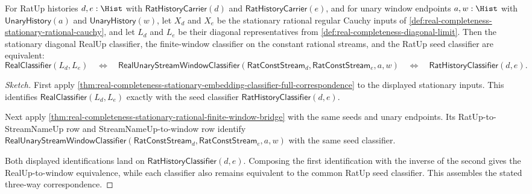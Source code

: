 \begin{theorem}
\label{thm:real-completeness-stationary-diagonal-window-classifier-correspondence}
For RatUp histories $d,e:\Hist$ with $\mathsf{RatHistoryCarrier}(d)$ and
$\mathsf{RatHistoryCarrier}(e)$, and for unary window endpoints $a,w:\Hist$
with $\mathsf{UnaryHistory}(a)$ and $\mathsf{UnaryHistory}(w)$, let $X_d$ and
$X_e$ be the stationary rational regular Cauchy inputs of
\autoref{def:real-completeness-stationary-rational-cauchy}, and let $L_d$ and
$L_e$ be their diagonal representatives from
\autoref{def:real-completeness-diagonal-limit}. Then the stationary diagonal
RealUp classifier, the finite-window classifier on the constant rational
streams, and the RatUp seed classifier are equivalent:
$$
\mathsf{RealClassifier}(L_d,L_e)
\quad\Longleftrightarrow\quad
\mathsf{RealUnaryStreamWindowClassifier}(\mathsf{RatConstStream}_d,\mathsf{RatConstStream}_e,a,w)
\quad\Longleftrightarrow\quad
\mathsf{RatHistoryClassifier}(d,e).
$$
\end{theorem}

\begin{proof}[Sketch]
First apply
\autoref{thm:real-completeness-stationary-embedding-classifier-full-correspondence}
to the displayed stationary inputs. This identifies
$\mathsf{RealClassifier}(L_d,L_e)$ exactly with the seed classifier
$\mathsf{RatHistoryClassifier}(d,e)$.

Next apply
\autoref{thm:real-completeness-stationary-rational-finite-window-bridge} with
the same seeds and unary endpoints. Its RatUp-to-StreamNameUp row and
StreamNameUp-to-window row identify
$\mathsf{RealUnaryStreamWindowClassifier}(\mathsf{RatConstStream}_d,\mathsf{RatConstStream}_e,a,w)$
with the same seed classifier.

Both displayed identifications land on
$\mathsf{RatHistoryClassifier}(d,e)$. Composing the first identification with
the inverse of the second gives the RealUp-to-window equivalence, while each
classifier also remains equivalent to the common RatUp seed classifier. This
assembles the stated three-way correspondence.
\end{proof}

